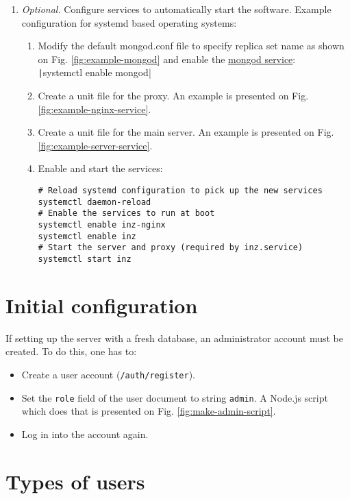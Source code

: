 \begin{enumerate}
    \item \textit{Optional.} Configure services to automatically start the software. Example configuration for systemd based operating systems:
    \begin{enumerate}
        \item Modify the default mongod.conf file to specify replica set name as shown on Fig. \ref{fig:example-mongod} and enable the \href{https://github.com/mongodb/mongo/blob/e4fff3e1fe7b31b25cedde7b05205325b47b4a7d/debian/mongod.service}{mongod service}:\\
        \texttt|systemctl enable mongod|
        \item Create a unit file for the proxy. An example is presented on Fig. \ref{fig:example-nginx-service}.
        \item Create a unit file for the main server. An example is presented on Fig. \ref{fig:example-server-service}.
        \item Enable and start the services:
        \begin{verbatim}
# Reload systemd configuration to pick up the new services
systemctl daemon-reload
# Enable the services to run at boot
systemctl enable inz-nginx
systemctl enable inz
# Start the server and proxy (required by inz.service)
systemctl start inz
        \end{verbatim}
    \end{enumerate}
\end{enumerate}

\section{Initial configuration}

If setting up the server with a fresh database, an administrator account must be created. To do this, one has to:

\begin{itemize}
    \item Create a user account (\texttt{/auth/register}).
    \item Set the \texttt{role} field of the user document to string \texttt{admin}. A Node.js script which does that is presented on Fig. \ref{fig:make-admin-script}.
    \item Log in into the account again.
\end{itemize}

\section{Types of users}
\label{chap:types-of-users}

